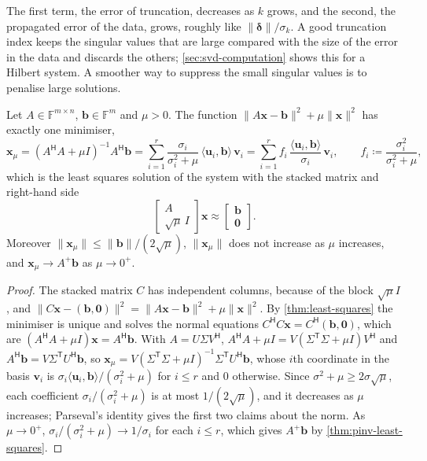 The first term, the error of truncation, decreases as $k$ grows, and the second, the propagated error of the data, grows, roughly like $\|\boldsymbol\delta\|/\sigma_k$. A good truncation index keeps the singular values that are large compared with the size of the error in the data and discards the others; \cref{sec:svd-computation} shows this for a Hilbert system. A smoother way to suppress the small singular values is to penalise large solutions.

\begin{theorem}
\label{thm:tikhonov}
Let $A\in\mathbb F^{m\times n}$, $\mathbf b\in\mathbb F^m$ and $\mu>0$. The function $\|A\mathbf x-\mathbf b\|^2+\mu\|\mathbf x\|^2$ has exactly one minimiser,
\[
\mathbf x_\mu=(A^{\mathsf H}A+\mu I)^{-1}A^{\mathsf H}\mathbf b=\sum_{i=1}^r\frac{\sigma_i}{\sigma_i^2+\mu}\,\langle\mathbf u_i,\mathbf b\rangle\,\mathbf v_i=\sum_{i=1}^rf_i\,\frac{\langle\mathbf u_i,\mathbf b\rangle}{\sigma_i}\,\mathbf v_i,\qquad f_i\coloneqq\frac{\sigma_i^2}{\sigma_i^2+\mu},
\]
which is the least squares solution of the system with the stacked matrix and right-hand side
\[
\begin{bmatrix}A\\\sqrt\mu\,I\end{bmatrix}\mathbf x\approx\begin{bmatrix}\mathbf b\\\mathbf 0\end{bmatrix}.
\]
Moreover $\|\mathbf x_\mu\|\le\|\mathbf b\|/(2\sqrt\mu)$, $\|\mathbf x_\mu\|$ does not increase as $\mu$ increases, and $\mathbf x_\mu\to A^+\mathbf b$ as $\mu\to0^+$.
\end{theorem}

\begin{proof}
The stacked matrix $C$ has independent columns, because of the block $\sqrt\mu I$, and $\|C\mathbf x-(\mathbf b,\mathbf 0)\|^2=\|A\mathbf x-\mathbf b\|^2+\mu\|\mathbf x\|^2$. By \cref{thm:least-squares} the minimiser is unique and solves the normal equations $C^{\mathsf H}C\mathbf x=C^{\mathsf H}(\mathbf b,\mathbf 0)$, which are $(A^{\mathsf H}A+\mu I)\mathbf x=A^{\mathsf H}\mathbf b$. With $A=U\Sigma V^{\mathsf H}$, $A^{\mathsf H}A+\mu I=V(\Sigma^{\mathsf T}\Sigma+\mu I)V^{\mathsf H}$ and $A^{\mathsf H}\mathbf b=V\Sigma^{\mathsf T}U^{\mathsf H}\mathbf b$, so $\mathbf x_\mu=V(\Sigma^{\mathsf T}\Sigma+\mu I)^{-1}\Sigma^{\mathsf T}U^{\mathsf H}\mathbf b$, whose $i$th coordinate in the basis $\mathbf v_i$ is $\sigma_i\langle\mathbf u_i,\mathbf b\rangle/(\sigma_i^2+\mu)$ for $i\le r$ and $0$ otherwise. Since $\sigma^2+\mu\ge2\sigma\sqrt\mu$, each coefficient $\sigma_i/(\sigma_i^2+\mu)$ is at most $1/(2\sqrt\mu)$, and it decreases as $\mu$ increases; Parseval's identity gives the first two claims about the norm. As $\mu\to0^+$, $\sigma_i/(\sigma_i^2+\mu)\to1/\sigma_i$ for each $i\le r$, which gives $A^+\mathbf b$ by \cref{thm:pinv-least-squares}.
\end{proof}

